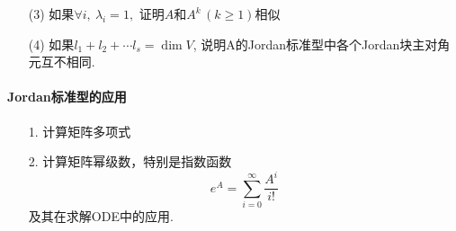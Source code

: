 \begin{itemize}
\item[(3)]如果$\forall i,\ \lambda_i = 1,$ 证明$A$和$A^k\,(k\ge 1)$相似
\begin{solution}
\end{solution}
\vspace{3cm}

\item[(4)] 如果$l_1 + l_2 +\cdots l_s = \dim V$, 说明A的Jordan标准型中各个Jordan块主对角元互不相同. 
\vspace{3cm}
\end{itemize}

\paragraph{Jordan标准型的应用}
\begin{itemize}
    \item [1. ] 计算矩阵多项式
    \item [2. ] 计算矩阵幂级数，特别是指数函数
    $$e^{A} = \sum_{i=0}^{\infty} \frac{A^i}{i!}$$
    及其在求解ODE中的应用.
    \begin{itemize}


\end{itemize}
\end{itemize}
